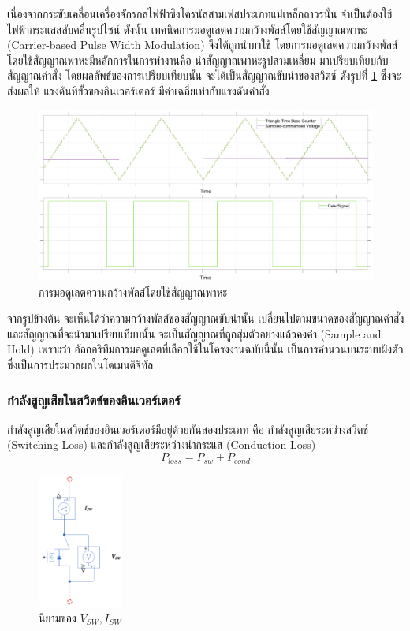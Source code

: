 \documentclass[11pt,a4paper]{article}
\begin{document}
เนื่องจากกระขับเคลื่อนเครื่องจักรกลไฟฟ้าซิงโครนัสสามเฟสประเภทแม่เหล็กถาวรนั้น จำเป็นต้องใช้ไฟฟ้ากระแสสลับคลื่นรูปไซน์ ดังนั้น เทคนิคการมอดูเลตความกว้างพัลส์โดยใช้สัญญาณพาหะ (Carrier-based Pulse Width Modulation) จึงได้ถูกนำมาใช้ โดยการมอดูเลตความกว้างพัลส์โดยใช้สัญญาณพาหะมีหลักการในการทำงานคือ นำสัญญาณพาหะรูปสามเหลี่ยม มาเปรียบเทียบกับสัญญาณคำสั่ง โดยผลลัพธ์ของการเปรียบเทียบนั้น จะได้เป็นสัญญาณขับนำของสวิตช์ ดังรูปที่ \ref{cbpwm} ซึ่งจะส่งผลให้ แรงดันที่ขั้วของอินเวอร์เตอร์ มีค่าเฉลี่ยเท่ากับแรงดันคำสั่ง

\begin{figure}[!h]
    \includegraphics[width=\textwidth]{spwm.eps}
    \caption{การมอดูเลตความกว้างพัลส์โดยใช้สัญญาณพาหะ}
    \label{cbpwm}
\end{figure}

จากรูปข้างต้น จะเห็นได้ว่าความกว้างพัลส์ของสัญญาณขับนำนั้น เปลี่ยนไปตามขนาดของสัญญาณคำสั่ง และสัญญาณที่จะนำมาเปรียบเทียบนั้น จะเป็นสัญญาณที่ถูกสุ่มตัวอย่างแล้วคงค่า (Sample and Hold) เพราะว่า อัลกอริทึมการมอดูเลตที่เลือกใช้ในโครงงานฉบับนี้นั้น เป็นการคำนวนบนระบบฝังตัว ซึ่งเป็นการประมวลผลในโดเมนดิจิทัล

\subsubsection{กำลังสูญเสียในสวิตช์ของอินเวอร์เตอร์}
กำลังสูญเสียในสวิตช์ของอินเวอร์เตอร์มีอยู่ด้วยกันสองประเภท คือ กำลังสูญเสียระหว่างสวิตช์ (Switching Loss) และกำลังสูญเสียระหว่างนำกระแส (Conduction Loss)
\begin{equation}
    P_{loss} = P_{sw} + P_{cond}
\end{equation}

\begin{figure}[h]
    \centering
    \includegraphics[width=0.25\textwidth]{vsw_isw.png}
    \caption{นิยามของ $V_{SW}, I_{SW}$}
    \label{vsw_isw_definition}
\end{figure}
\end{document}

